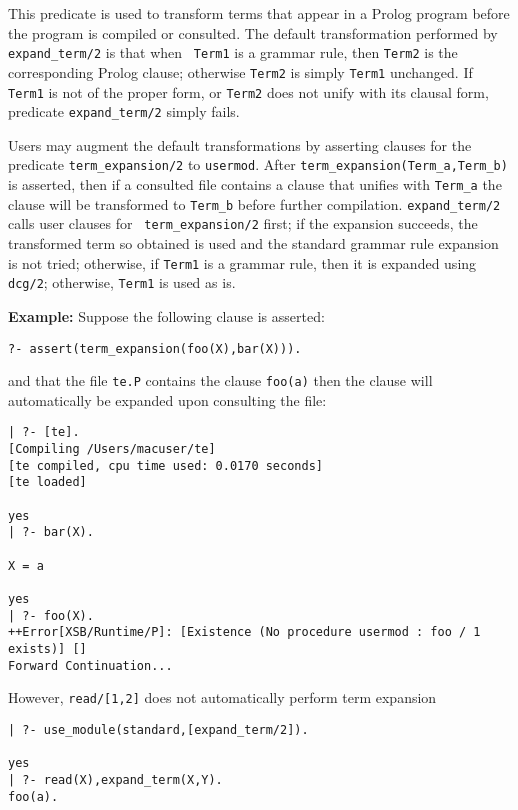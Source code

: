 \begin{description}
%
This predicate is used to transform terms that appear in a Prolog
program before the program is compiled or consulted.  The default
transformation performed by {\tt expand\_term/2} is that when {\tt
  Term1} is a grammar rule, then {\tt Term2} is the corresponding
Prolog clause; otherwise {\tt Term2} is simply {\tt Term1}
unchanged. If {\tt Term1} is not of the proper form, or {\tt Term2}
does not unify with its clausal form, predicate {\tt expand\_term/2}
simply fails.

Users may augment the default transformations by asserting clauses for
the predicate {\tt term\_expansion/2}
to {\tt usermod}.  After {\tt term\_expansion(Term\_a,Term\_b)} is
asserted, then if a consulted file contains a clause that unifies with
{\tt Term\_a} the clause will be transformed to {\tt Term\_b} before
further compilation.  {\tt expand\_term/2} calls user clauses for {\tt
  term\_expansion/2} first; if the expansion succeeds, the transformed
term so obtained is used and the standard grammar rule expansion is
not tried; otherwise, if {\tt Term1} is a grammar rule, then it is
expanded using {\tt dcg/2}; otherwise, {\tt Term1} is used as is.

{\bf Example:} 
%
Suppose the following clause is asserted:
%
\begin{verbatim}
?- assert(term_expansion(foo(X),bar(X))).
\end{verbatim}
and that the file {\tt te.P} contains the clause
%
{\tt foo(a)}
%
then the clause will automatically be expanded upon consulting the file:
%
\begin{verbatim}
| ?- [te].
[Compiling /Users/macuser/te]
[te compiled, cpu time used: 0.0170 seconds]
[te loaded]

yes
| ?- bar(X).

X = a

yes
| ?- foo(X).
++Error[XSB/Runtime/P]: [Existence (No procedure usermod : foo / 1 exists)] []
Forward Continuation...
\end{verbatim}

However, {\tt read/[1,2]} does not automatically perform term expansion
%
\begin{verbatim}
| ?- use_module(standard,[expand_term/2]).

yes
| ?- read(X),expand_term(X,Y).
foo(a).


\end{verbatim}
\end{description}
